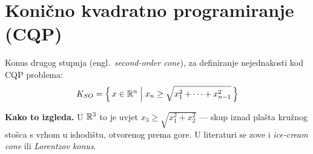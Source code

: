 \section{Konično kvadratno programiranje (CQP)}
\label{sec:cqp}

\begin{definicija}
Konus drugog stupnja (engl.\ \emph{second-order cone}), za definiranje
nejednakosti kod CQP problema:
\[
K_{SO} = \Big\{\, x \in \mathbb{R}^n \;\Big|\;
x_n \ge \sqrt{x_1^2 + \dots + x_{n-1}^2} \,\Big\}
\]
\end{definicija}

\textbf{Kako to izgleda.} U $\mathbb{R}^3$ to je uvjet $x_3 \ge \sqrt{x_1^2+x_2^2}$ ---
skup iznad plašta kružnog stošca s vrhom u ishodištu, otvorenog prema gore. U
literaturi se zove i \emph{ice-cream cone} ili \emph{Lorentzov konus}.

